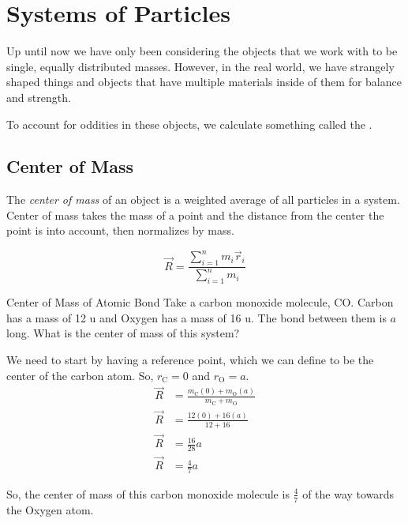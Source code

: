 \section{Systems of Particles} \label{sec:Systems of Particles}
Up until now we have only been considering the objects that we work with to be single, equally distributed masses.
However, in the real world, we have strangely shaped things and objects that have multiple materials inside of them for balance and strength.

To account for oddities in these objects, we calculate something called the .

\subsection{Center of Mass} \label{subsec:Center of Mass}
\begin{definition} \label{def:Center of Mass}
  The \emph{center of mass} of an object is a weighted average of all particles in a system.
  Center of mass takes the mass of a point and the distance from the center the point is into account, then normalizes by mass.

  \begin{equation} \label{eq:Center of Mass}
    \vec{R} = \frac{\sum\limits_{i=1}^{n} m_{i} \vec{r}_{i}}{\sum\limits_{i=1}^{n} m_{i}}
  \end{equation}
\end{definition}

\begin{example}[]{Center of Mass of Atomic Bond}
  Take a carbon monoxide molecule, CO.
  Carbon has a mass of 12 \si{\atomicmassunit} and Oxygen has a mass of 16 \si{\atomicmassunit}.
  The bond between them is $a$ long.
  What is the center of mass of this system?

  \tcblower

  We need to start by having a reference point, which we can define to be the center of the carbon atom.
  So, $r_{\text{C}} = 0$ and $r_{\text{O}} = a$.
  \begin{align*}
    \vec{R} &= \frac{m_{\text{C}} (0) + m_{\text{O}} (a)}{m_{\text{C}} + m_{\text{O}}} \\
    \vec{R} &= \frac{12 (0) + 16 (a)}{12 + 16} \\
    \vec{R} &= \frac{16}{28} a \\
    \vec{R} &= \frac{4}{7} a
  \end{align*}

  So, the center of mass of this carbon monoxide molecule is $\frac{4}{7}$ of the way towards the Oxygen atom.
\end{example}

